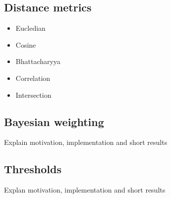 \subsection{Distance metrics}
\begin{itemize}
\item Eucledian
\item Cosine
\item Bhattacharyya
\item Correlation
\item Intersection
\end{itemize}

\subsection{Bayesian weighting}
Explain motivation, implementation and short results

\subsection{Thresholds}
Explan motivation, implementation and short results